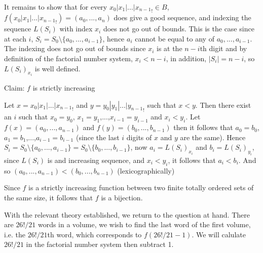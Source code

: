 \documentclass[11pt]{article}
\begin{document}
It remains to show that for every $x_0|x_1|...|{x_{n-1}}_!\in B$, $f(x_0|x_1|...|{x_{n-1}}_!)=(a_0,...,a_n)$ does give a good sequence, and indexing the sequence $L(S_i)$ with index $x_i$ does not go out of bounds. This is the case since at each $i$, $S_i=S_0\setminus\{a_0,...,a_{i-1}\}$, hence $a_i$ cannot be equal to any of $a_0,...,a_{i-1}$. The indexing does not go out of bounds since $x_i$ is at the $n-i$th digit and by definition of the factorial number system, $x_i<n-i$, in addition, $|S_i|=n-i$, so $L(S_i)_{x_i}$ is well defined.

Claim: $f$ is strictly increasing

Let $x=x_0|x_1|...|{x_{n-1}}_!$ and $y=y_0|y_1|...|{y_{n-1}}_!$ such that $x<y$. Then there exist an $i$ such that $x_0=y_0$, $x_1=y_1$,...,$x_{i-1}=y_{i-1}$ and $x_i<y_i$. Let $f(x)=(a_0,...,a_{n-1})$ and $f(y)=(b_0,...,b_{n-1})$ then it follows that $a_0=b_0$, $a_1=b_1$,...,$a_{i-1}=b_{i-1}$ (since the last $i$ digits of $x$ and $y$ are the same). Hence $S_i=S_0\setminus\{a_0,...,a_{i-1}\}=S_0\setminus\{b_0,...,b_{i-1}\}$, now $a_i=L(S_i)_{x_i}$ and $b_i=L(S_i)_{y_i}$, since $L(S_i)$ is and increasing sequence, and $x_i<y_i$, it follows that $a_i<b_i$. And so $(a_0,...,a_{n-1})<(b_0,...,b_{n-1})$ (lexicographically)

Since $f$ is a strictly increasing function between two finite totally ordered sets of the same size, it follows that $f$ is a bijection.

With the relevant theory established, we return to the question at hand. There are $26!/21$ words in a volume, we wish to find the last word of the first volume, i.e. the $26!/21$th word, which corresponds to $f(26!/21-1)$. We will calulate $26!/21$ in the factorial number system then subtract 1. 
\end{document}
